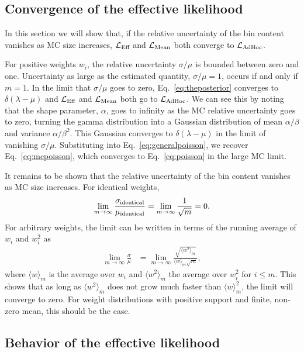 \documentclass[a4paper, 11pt]{article}
\newcommand{\like}{\mathcal{L}}
\newcommand{\meanl}{\mathcal{L}_{\textmd{Mean}}}
\newcommand{\mcl}{\like_\textmd{Eff}}
\newcommand{\adhoc}{\mathcal{L}_{\textmd{AdHoc}}}
\newcommand{\agpar}{\alpha}
\newcommand{\bgpar}{\beta}
\begin{document}
\subsection{Convergence of the effective likelihood\label{sec:llhconvergence}}

In this section we will show that, if the relative uncertainty of the bin content vanishes as MC size increases, $\mcl$ and $\meanl$ both converge to $\adhoc$. 

For positive weights $w_i$, the relative uncertainty $\sigma/\mu$ is bounded between zero and one. Uncertainty as large as the estimated quantity, $\sigma/\mu=1$, occurs if and only if $m=1$. In the limit that $\sigma/\mu$ goes to zero, Eq.~\eqref{eq:theposterior} converges to $\delta(\lambda - \mu)$ and $\mcl$ and $\meanl$ both go to $\adhoc$. We can see this by noting that the shape parameter, $\agpar$, goes to infinity as the MC relative uncertainty goes to zero, turning the gamma distribution into a Gaussian distribution of mean $\agpar / \bgpar$ and variance $\agpar / \bgpar^2$. This Gaussian converges to $\delta(\lambda-\mu)$ in the limit of vanishing $\sigma/\mu$. Substituting into Eq.~\eqref{eq:generalpoisson}, we recover Eq.~\eqref{eq:mcpoisson}, which converges to Eq.~\eqref{eq:poisson} in the large MC limit.

It remains to be shown that the relative uncertainty of the bin content vanishes as MC size increases. For identical weights,
\begin{equation}
\lim_{m\to\infty} \frac{\sigma_{\rm identical}}{\mu_{\rm identical}} = \lim_{m\to\infty} \frac{1}{\sqrt{m}} = 0 .
\end{equation}
For arbitrary weights, the limit can be written in terms of the running average of $w_i$ and $w_i^2$ as
\begin{align}
\lim_{m\to\infty} \frac{\sigma}{\mu} &= \lim_{m\to\infty} \frac{\sqrt{\langle w^2 \rangle_m}}{\langle w\rangle_m\sqrt{m}},
\end{align}
where $\langle w \rangle_m$ is the average over $w_i$ and $\langle w^2 \rangle_m$ the average over $w_i^2$ for $i \leq m$. This shows that as long as $\langle w^2 \rangle_m$ does not grow much faster than $\langle w \rangle_m^2$, the limit will converge to zero. For weight distributions with positive support and finite, non-zero mean, this should be the case.

\subsection{Behavior of the effective likelihood\label{sec:llhbehavior}}
\end{document}
